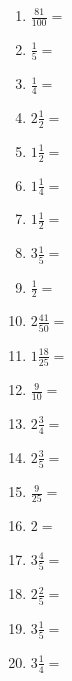 \documentclass[12pt]{article}
\begin{document}
\begin{enumerate}
\item \large $ \frac{81}{100} = $ \vspace{1.2cm}
\item \large $ \frac{1}{5} = $ \vspace{1.2cm}
\item \large $ \frac{1}{4} = $ \vspace{1.2cm}
\item \large $ 2 \frac{1}{2} = $ \vspace{1.2cm}
\item \large $ 1 \frac{1}{2} = $ \vspace{1.2cm}
\item \large $ 1 \frac{1}{4} = $ \vspace{1.2cm}
\item \large $ 1 \frac{1}{2} = $ \vspace{1.2cm}
\item \large $ 3 \frac{1}{5} = $ \vspace{1.2cm}
\item \large $ \frac{1}{2} = $ \vspace{1.2cm}
\item \large $ 2 \frac{41}{50} = $ \vspace{1.2cm}
\newpage
\item \large $ 1 \frac{18}{25} = $ \vspace{1.5cm}
\item \large $ \frac{9}{10} = $ \vspace{1.5cm}
\item \large $ 2 \frac{3}{4} = $ \vspace{1.5cm}
\item \large $ 2 \frac{3}{5} = $ \vspace{1.5cm}
\item \large $ \frac{9}{25} = $ \vspace{1.5cm}
\item \large $ 2 = $ \vspace{1.5cm}
\item \large $ 3 \frac{4}{5} = $ \vspace{1.5cm}
\item \large $ 2 \frac{2}{5} = $ \vspace{1.5cm}
\item \large $ 3 \frac{1}{5} = $ \vspace{1.5cm}
\item \large $ 3 \frac{1}{4} = $ \vspace{1.5cm}

\end{enumerate}
\end{document}
